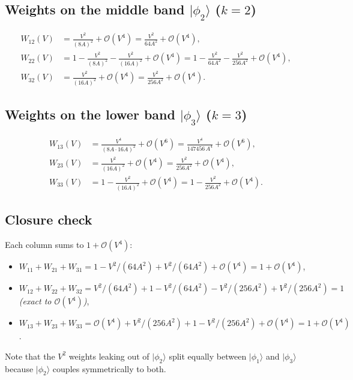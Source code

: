 \documentclass[11pt]{article}
\begin{document}
\subsection{Weights on the middle band $|\phi_2\rangle$ ($k=2$)}

\begin{align}
W_{12}(V) &= \frac{V^2}{(8A)^2} + \mathcal O(V^4) = \frac{V^2}{64A^2} + \mathcal O(V^4),\\
W_{22}(V) &= 1 - \frac{V^2}{(8A)^2} - \frac{V^2}{(16A)^2} + \mathcal O(V^4) = 1 - \frac{V^2}{64A^2} - \frac{V^2}{256A^2} + \mathcal O(V^4),\\
W_{32}(V) &= \frac{V^2}{(16A)^2} + \mathcal O(V^4) = \frac{V^2}{256A^2} + \mathcal O(V^4).
\end{align}

\subsection{Weights on the lower band $|\phi_3\rangle$ ($k=3$)}

\begin{align}
W_{13}(V) &= \frac{V^4}{(8A \cdot 16A)^2} + \mathcal O(V^6) = \frac{V^4}{147456\,A^4} + \mathcal O(V^6),\\
W_{23}(V) &= \frac{V^2}{(16A)^2} + \mathcal O(V^4) = \frac{V^2}{256A^2} + \mathcal O(V^4),\\
W_{33}(V) &= 1 - \frac{V^2}{(16A)^2} + \mathcal O(V^4) = 1 - \frac{V^2}{256A^2} + \mathcal O(V^4).
\end{align}

\subsection{Closure check}

Each column sums to $1 + \mathcal O(V^4)$:
\begin{itemize}
\item $W_{11} + W_{21} + W_{31} = 1 - V^2/(64A^2) + V^2/(64A^2) + \mathcal O(V^4) = 1 + \mathcal O(V^4)$,
\item $W_{12} + W_{22} + W_{32} = V^2/(64A^2) + 1 - V^2/(64A^2) - V^2/(256A^2) + V^2/(256A^2) = 1$ \emph{(exact to $\mathcal O(V^4)$)},
\item $W_{13} + W_{23} + W_{33} = \mathcal O(V^4) + V^2/(256A^2) + 1 - V^2/(256A^2) + \mathcal O(V^4) = 1 + \mathcal O(V^4)$.
\end{itemize}
Note that the $V^2$ weights leaking out of $|\phi_2\rangle$ split equally between $|\phi_1\rangle$ and $|\phi_3\rangle$ because $|\phi_2\rangle$ couples symmetrically to both.
\end{document}
